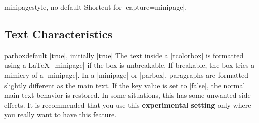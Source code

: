 \begin{docTcbKey}{minipage}{}{style, no default}
  Shortcut for |capture=minipage|.
\end{docTcbKey}


\clearpage
\subsection{Text Characteristics}
\begin{docTcbKey}[][doc updated=2024-01-10]{parbox}{}{default |true|, initially |true|}
  The text inside a |tcolorbox| is formatted using a \LaTeX\ |minipage|
  if the box is unbreakable. If breakable, the box tries a mimicry of
  a |minipage|. In a |minipage| or |parbox|, paragraphs are formatted slightly different
  as the main text. If the key value is set to |false|, the normal main text
  behavior is restored. In some situations, this has some unwanted side
  effects. It is recommended that you use this \textbf{experimental setting} only
  where you really want to have this feature.
\end{docTcbKey}

\begin{dispListing}

\begin{tcolorbox}[parbox,adjusted title={parbox=true (normal)}]
  \lipsum[1-2]
\end{tcolorbox}\hfill%
\begin{tcolorbox}[parbox=false,adjusted title={parbox=false}]
  \lipsum[1-2]
\end{tcolorbox}%
\end{dispListing}
{\tcbusetemp}


